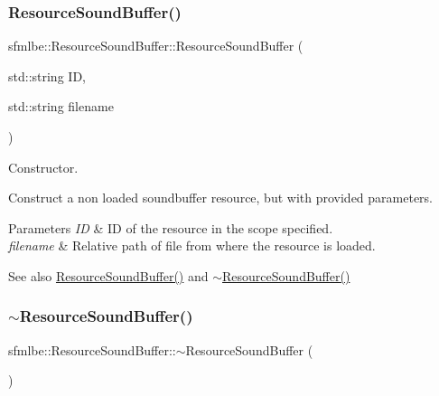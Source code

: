 \subsubsection{\texorpdfstring{Resource\+Sound\+Buffer()}{ResourceSoundBuffer()}\hspace{0.1cm}{\footnotesize\ttfamily [2/2]}}
{\footnotesize\ttfamily sfmlbe\+::\+Resource\+Sound\+Buffer\+::\+Resource\+Sound\+Buffer (\begin{DoxyParamCaption}\item[{std\+::string}]{ID,  }\item[{std\+::string}]{filename }\end{DoxyParamCaption})}



Constructor. 

Construct a non loaded soundbuffer resource, but with provided parameters. 
\begin{DoxyParams}{Parameters}
{\em ID} & ID of the resource in the scope specified. \\
\hline
{\em filename} & Relative path of file from where the resource is loaded. \\
\hline
\end{DoxyParams}
\begin{DoxySeeAlso}{See also}
\mbox{\hyperlink{classsfmlbe_1_1_resource_sound_buffer_a88d7088f7f0e02879c0a62563851cb67}{Resource\+Sound\+Buffer()}} and \mbox{\hyperlink{classsfmlbe_1_1_resource_sound_buffer_a28e17a59ffd9de59eb6394ed564efc11}{$\sim$\+Resource\+Sound\+Buffer()}} 
\end{DoxySeeAlso}
\mbox{\label{classsfmlbe_1_1_resource_sound_buffer_a28e17a59ffd9de59eb6394ed564efc11}} 
\subsubsection{\texorpdfstring{$\sim$\+Resource\+Sound\+Buffer()}{~ResourceSoundBuffer()}}
{\footnotesize\ttfamily sfmlbe\+::\+Resource\+Sound\+Buffer\+::$\sim$\+Resource\+Sound\+Buffer (\begin{DoxyParamCaption}{ }\end{DoxyParamCaption})}



